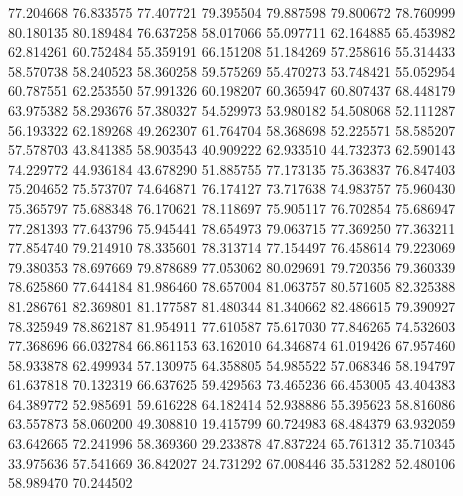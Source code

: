 77.204668
76.833575
77.407721
79.395504
79.887598
79.800672
78.760999
80.180135
80.189484
76.637258
58.017066
55.097711
62.164885
65.453982
62.814261
60.752484
55.359191
66.151208
51.184269
57.258616
55.314433
58.570738
58.240523
58.360258
59.575269
55.470273
53.748421
55.052954
60.787551
62.253550
57.991326
60.198207
60.365947
60.807437
68.448179
63.975382
58.293676
57.380327
54.529973
53.980182
54.508068
52.111287
56.193322
62.189268
49.262307
61.764704
58.368698
52.225571
58.585207
57.578703
43.841385
58.903543
40.909222
62.933510
44.732373
62.590143
74.229772
44.936184
43.678290
51.885755
77.173135
75.363837
76.847403
75.204652
75.573707
74.646871
76.174127
73.717638
74.983757
75.960430
75.365797
75.688348
76.170621
78.118697
75.905117
76.702854
75.686947
77.281393
77.643796
75.945441
78.654973
79.063715
77.369250
77.363211
77.854740
79.214910
78.335601
78.313714
77.154497
76.458614
79.223069
79.380353
78.697669
79.878689
77.053062
80.029691
79.720356
79.360339
78.625860
77.644184
81.986460
78.657004
81.063757
80.571605
82.325388
81.286761
82.369801
81.177587
81.480344
81.340662
82.486615
79.390927
78.325949
78.862187
81.954911
77.610587
75.617030
77.846265
74.532603
77.368696
66.032784
66.861153
63.162010
64.346874
61.019426
67.957460
58.933878
62.499934
57.130975
64.358805
54.985522
57.068346
58.194797
61.637818
70.132319
66.637625
59.429563
73.465236
66.453005
43.404383
64.389772
52.985691
59.616228
64.182414
52.938886
55.395623
58.816086
63.557873
58.060200
49.308810
19.415799
60.724983
68.484379
63.932059
63.642665
72.241996
58.369360
29.233878
47.837224
65.761312
35.710345
33.975636
57.541669
36.842027
24.731292
67.008446
35.531282
52.480106
58.989470
70.244502
